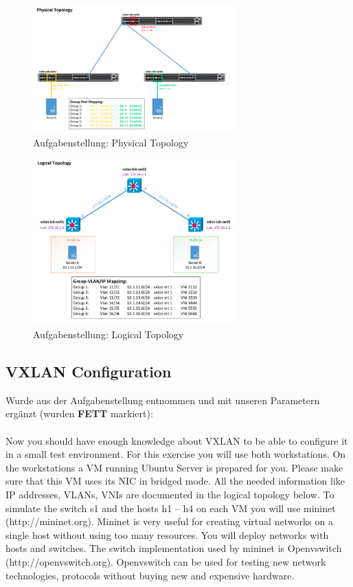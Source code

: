 \documentclass[a4,12pt]{scrartcl}
\begin{document}
\begin{figure} [H]
	\begin{center}
	\includegraphics[width=0.70\textwidth]{./pictures/vxlan_physical.png}
	\caption{Aufgabenstellung: Physical Topology}
	\label{x}
	\end{center}
\end{figure}

\begin{figure} [H]
	\begin{center}
	\includegraphics[width=0.70\textwidth]{./pictures/vxlan_logical.png}
	\caption{Aufgabenstellung: Logical Topology}
	\label{x}
	\end{center}
\end{figure}

\subsection{VXLAN Configuration}
Wurde aus der Aufgabenstellung entnommen und mit unseren Parametern ergänzt (wurden \textbf{FETT} markiert): \\
\\
Now you should have enough knowledge about VXLAN to be able to configure it in a small test environment. For this exercise you will use both workstations. On the workstations a VM running Ubuntu Server is prepared for you. Please make sure that this VM uses its NIC in bridged mode. All the needed information like IP addresses, VLANs, VNIs are documented in the logical topology below.
To simulate the switch s1 and the hosts h1 – h4 on each VM you will use mininet (http://mininet.org).
Mininet is very useful for creating virtual networks on a single host without using too many resources. You will deploy networks with hosts and switches. The switch implementation used by mininet is Openvswitch (http://openvswitch.org). Openvswitch can be used for testing new network technologies, protocols without buying new and expensive hardware.
\end{document}
